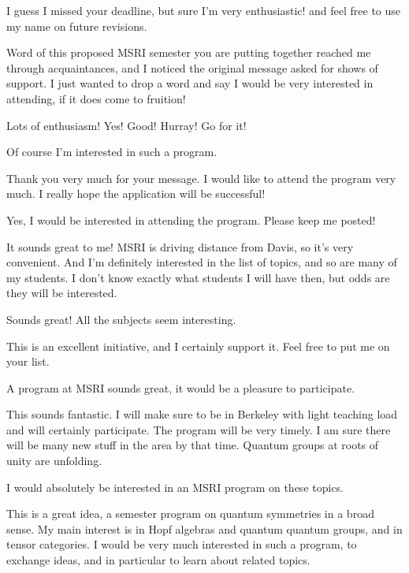 \documentclass[12pt]{article}
\begin{document}
\begin{description}
  \setlength{\itemsep}{1pt}
  \setlength{\parskip}{0pt}
  \setlength{\parsep}{0pt}
\item[David Ben-Zvi] I guess I missed your deadline, but sure I'm very enthusiastic! and feel free to use my name on future revisions.
\item[Alexandru Chirvasitua] Word of this proposed MSRI semester you are putting together reached me through acquaintances, and I noticed the original message asked for shows of support. I just wanted to drop a word and say I would be very interested in attending, if it does come to fruition!
\item[Andre Henriques] Lots of enthusiasm! Yes! Good! Hurray! Go for it!
\item[Masaki Izumi] Of course I'm interested in such a program.
\item[Yasuyuki Kawahigashi] Thank you very much for your message. I would like to attend the program very much. I really hope the application will be successful!
\item[Alexander Kirillov] Yes, I would be interested in attending the program. Please keep me posted!
\item[Greg Kuperberg] It sounds great to me!   MSRI is driving distance from Davis, so it's very convenient.  And I'm definitely interested in the list of topics, and so are many of my students.   I don't know exactly what students I will have then, but odds are they will be interested.
\item[Zhengwei Liu] Sounds great! All the subjects seem interesting.
\item[Michael M\"uger] This is an excellent initiative, and I certainly support it. Feel free to put me on your list. 
\item[Sonia Natale] A program at MSRI sounds great, it would be a pleasure to participate.
\item[Nicolai Reshetikhin] This sounds fantastic. I will make sure to be in Berkeley with light teaching load and will certainly participate. The program will be very timely. I am sure there will be many new stuff in the area by that time. Quantum groups at roots of unity are unfolding.
\item[Claudia Scheimbauer] I would absolutely be interested in an MSRI program on these topics.
\item[Hans-J\"urgen Schneider] This is a great idea, a semester program on quantum symmetries in a broad sense. My main interest is in Hopf algebras and quantum quantum groups, and in tensor categories. I would be very much interested in such a program, to exchange ideas, and in particular to learn about related topics.

\end{description}
\end{document}
